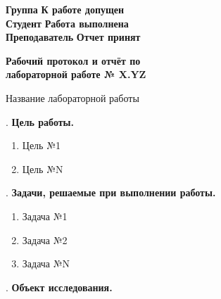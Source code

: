 \documentclass[12pt]{article}
\newcommand{\placeholder}[1]{{\color{magenta}#1}}
\begin{document}
    \vspace*{2\baselineskip}

    \thispagestyle{fancy}

    \noindent
    \textbf{Группа} \underline{\hspace{4.85cm}} \hfill \textbf{К работе допущен} \underline{\hspace{4cm}} \\[0.5cm]
    \textbf{Студент} \underline{\hspace{4.6cm}} \hfill \textbf{Работа выполнена} \underline{\hspace{4cm}} \\[0.5cm]
    \textbf{Преподаватель} \underline{\hspace{3.2cm}} \hfill \textbf{Отчет принят} \underline{\hspace{4.85cm}} \\


    \begin{center}
    {\huge \textbf{Рабочий протокол и отчёт по\\ лабораторной работе № \placeholder{X.YZ}}}

        \smallvspace

        {\Large \placeholder{Название лабораторной работы}}
    \end{center}


    . \textbf{Цель работы.}

    \begin{enumerate}
        \item \placeholder{Цель №1}

        \item \placeholder{Цель №N}
    \end{enumerate}

    \mediumvspace

    . \textbf{Задачи, решаемые при выполнении работы.}

    \begin{enumerate}
        \item \placeholder{Задача №1}

        \item \placeholder{Задача №2}

        \item \placeholder{Задача №N}
    \end{enumerate}

    \mediumvspace

    . \textbf{Объект исследования.}
\end{document}
